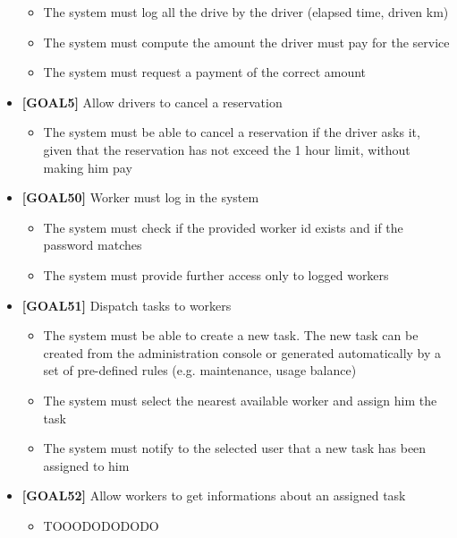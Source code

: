 \begin{itemize}
	\begin{itemize}
	\item The system must log all the drive by the driver (elapsed time, driven km)
	\item The system must compute the amount the driver must pay for the service
	\item The system must request a payment of the correct amount 
	\end{itemize}
\item \textbf{[GOAL5]} Allow drivers to cancel a reservation
	\begin{itemize}
	\item The system must be able to cancel a reservation if the driver asks it, given that the reservation has not exceed the 1 hour limit, without making him pay
	\end{itemize}
\item \textbf{[GOAL50]} Worker must log in the system
	\begin{itemize}
	\item The system must check if the provided worker id exists and if the password matches
	\item The system must provide further access only to logged workers
	\end{itemize}
\item \textbf{[GOAL51]} Dispatch tasks to workers
	\begin{itemize}
	\item The system must be able to create a new task. The new task can be created from the administration console or generated automatically by a set of pre-defined rules (e.g. maintenance, usage balance)
	\item The system must select the nearest available worker and assign him the task
	\item The system must notify to the selected user that a new task has been assigned to him
	\end{itemize}
\item \textbf{[GOAL52]} Allow workers to get informations about an assigned task
	\begin{itemize}
	\item TOOODODODODO
	\end{itemize}
\end{itemize}
